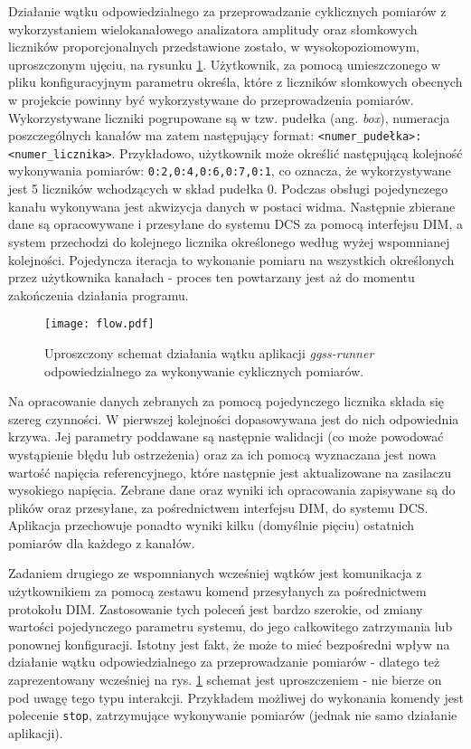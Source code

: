 Działanie wątku odpowiedzialnego za przeprowadzanie cyklicznych pomiarów z wykorzystaniem wielokanałowego analizatora amplitudy oraz słomkowych liczników proporcjonalnych przedstawione zostało, w wysokopoziomowym, uproszczonym ujęciu, na rysunku \ref{fig:flow_main}. Użytkownik, za pomocą umieszczonego w pliku konfiguracyjnym parametru określa, które z liczników słomkowych obecnych w projekcie powinny być wykorzystywane do przeprowadzenia pomiarów. Wykorzystywane liczniki pogrupowane są w tzw. pudełka (ang. \emph{box}), numeracja poszczególnych kanałów ma zatem następujący format: \lstinline{<numer_pudełka>:<numer_licznika>}. Przykładowo, użytkownik może określić następującą kolejność wykonywania pomiarów: \lstinline{0:2,0:4,0:6,0:7,0:1}, co oznacza, że wykorzystywane jest 5 liczników wchodzących w skład pudełka 0. Podczas obsługi pojedynczego kanału wykonywana jest akwizycja danych w postaci widma. Następnie zbierane dane są opracowywane i przesyłane do systemu DCS za pomocą interfejsu DIM, a system przechodzi do kolejnego licznika określonego według wyżej wspomnianej kolejności. Pojedyncza iteracja to wykonanie pomiaru na wszystkich określonych przez użytkownika kanałach - proces ten powtarzany jest aż do momentu zakończenia działania programu.


\begin{figure}[H]
\centering
\texttt{[image: flow.pdf]}
\caption{Uproszczony schemat działania wątku aplikacji \emph{ggss-runner} odpowiedzialnego za wykonywanie cyklicznych pomiarów.}
\label{fig:flow_main}
\end{figure}

Na opracowanie danych zebranych za pomocą pojedynczego licznika składa się szereg czynności. W pierwszej kolejności dopasowywana jest do nich odpowiednia krzywa. Jej parametry poddawane są następnie walidacji (co może powodować wystąpienie błędu lub ostrzeżenia) oraz za ich pomocą wyznaczana jest nowa wartość napięcia referencyjnego, które następnie jest aktualizowane na zasilaczu wysokiego napięcia. Zebrane dane oraz wyniki ich opracowania zapisywane są do plików oraz przesyłane, za pośrednictwem interfejsu DIM, do systemu DCS. Aplikacja przechowuje ponadto wyniki kilku (domyślnie pięciu) ostatnich pomiarów dla każdego z kanałów.

Zadaniem drugiego ze wspomnianych wcześniej wątków jest komunikacja z użytkownikiem za pomocą zestawu komend przesyłanych za pośrednictwem protokołu DIM. Zastosowanie tych poleceń jest bardzo szerokie, od zmiany wartości pojedynczego parametru systemu, do jego całkowitego zatrzymania lub ponownej konfiguracji. Istotny jest fakt, że może to mieć bezpośredni wpływ na działanie wątku odpowiedzialnego za przeprowadzanie pomiarów - dlatego też zaprezentowany wcześniej na rys. \ref{fig:flow_main} schemat jest uproszczeniem - nie bierze on pod uwagę tego typu interakcji. Przykładem możliwej do wykonania komendy jest polecenie \lstinline{stop}, zatrzymujące wykonywanie pomiarów (jednak nie samo działanie aplikacji).

